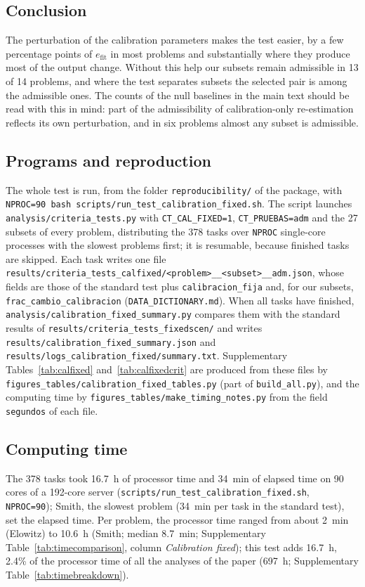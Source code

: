 \subsection*{Conclusion}
The perturbation of the calibration parameters makes the test easier, by a few percentage points of $e_{\mathrm{fit}}$ in most problems and substantially where they produce most of the output change. Without this help our subsets remain admissible in 13 of 14 problems, and where the test separates subsets the selected pair is among the admissible ones. The counts of the null baselines in the main text should be read with this in mind: part of the admissibility of calibration-only re-estimation reflects its own perturbation, and in six problems almost any subset is admissible.

\subsection*{Programs and reproduction}
The whole test is run, from the folder \texttt{reproducibility/} of the package, with \texttt{NPROC=90 bash scripts/run\_test\_calibration\_fixed.sh}. The script launches \texttt{analysis/criteria\_tests.py} with \texttt{CT\_CAL\_FIXED=1}, \texttt{CT\_PRUEBAS=adm} and the 27 subsets of every problem, distributing the 378 tasks over \texttt{NPROC} single-core processes with the slowest problems first; it is resumable, because finished tasks are skipped. Each task writes one file \texttt{results/criteria\_tests\_calfixed/<problem>\_\_<subset>\_\_adm.json}, whose fields are those of the standard test plus \texttt{calibracion\_fija} and, for our subsets, \texttt{frac\_cambio\_calibracion} (\texttt{DATA\_DICTIONARY.md}). When all tasks have finished, \texttt{analysis/calibration\_fixed\_summary.py} compares them with the standard results of \texttt{results/criteria\_tests\_fixedscen/} and writes \texttt{results/calibration\_fixed\_summary.json} and \texttt{results/logs\_calibration\_fixed/summary.txt}. Supplementary Tables~\ref{tab:calfixed} and~\ref{tab:calfixedcrit} are produced from these files by \texttt{figures\_tables/calibration\_fixed\_tables.py} (part of \texttt{build\_all.py}), and the computing time by \texttt{figures\_tables/make\_timing\_notes.py} from the field \texttt{segundos} of each file.

\subsection*{Computing time}
The 378 tasks took 16.7~h of processor time and 34~min of elapsed time on 90 cores of a 192-core server (\texttt{scripts/run\_test\_calibration\_fixed.sh}, \texttt{NPROC=90}); Smith, the slowest problem (34~min per task in the standard test), set the elapsed time. Per problem, the processor time ranged from about 2~min (Elowitz) to 10.6~h (Smith; median 8.7~min; Supplementary Table~\ref{tab:timecomparison}, column \emph{Calibration fixed}); this test adds 16.7~h, 2.4\% of the processor time of all the analyses of the paper (697~h; Supplementary Table~\ref{tab:timebreakdown}).

{\small

}


